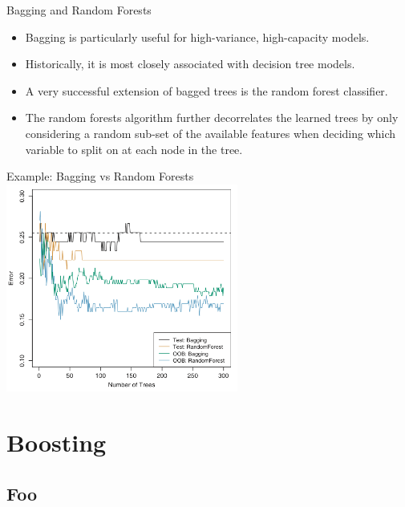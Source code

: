 \documentclass[serif,xcolor=pdftex,dvipsnames,table,hyperref={bookmarks=false,breaklinks}]{beamer}
\begin{document}
\begin{frame}[t]{Bagging and Random Forests}

\begin{itemize}
\setlength{\itemsep}{8pt}

\item Bagging is particularly useful for high-variance, high-capacity models.

\pause\item Historically, it is most closely associated with decision tree models.

\pause\item A very successful extension of bagged trees is the random forest classifier.

\pause\item The random forests algorithm further decorrelates the learned trees by 
only considering a random sub-set of the available features when deciding which
variable to split on at each node in the tree.

\end{itemize}

\end{frame}

\begin{frame}[t]{Example: Bagging vs Random Forests}
\center
\includegraphics[width=3in]{../Figures/bagging_rf.png}
\end{frame}

\section{Boosting}
\subsection{Foo}
\end{document}
